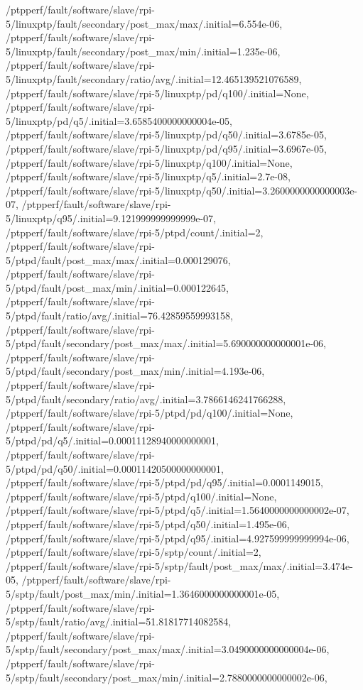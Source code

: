 {    /ptpperf/fault/software/slave/rpi-5/linuxptp/fault/secondary/post_max/max/.initial=6.554e-06,
    /ptpperf/fault/software/slave/rpi-5/linuxptp/fault/secondary/post_max/min/.initial=1.235e-06,
    /ptpperf/fault/software/slave/rpi-5/linuxptp/fault/secondary/ratio/avg/.initial=12.465139521076589,
    /ptpperf/fault/software/slave/rpi-5/linuxptp/pd/q100/.initial=None,
    /ptpperf/fault/software/slave/rpi-5/linuxptp/pd/q5/.initial=3.6585400000000004e-05,
    /ptpperf/fault/software/slave/rpi-5/linuxptp/pd/q50/.initial=3.6785e-05,
    /ptpperf/fault/software/slave/rpi-5/linuxptp/pd/q95/.initial=3.6967e-05,
    /ptpperf/fault/software/slave/rpi-5/linuxptp/q100/.initial=None,
    /ptpperf/fault/software/slave/rpi-5/linuxptp/q5/.initial=2.7e-08,
    /ptpperf/fault/software/slave/rpi-5/linuxptp/q50/.initial=3.2600000000000003e-07,
    /ptpperf/fault/software/slave/rpi-5/linuxptp/q95/.initial=9.121999999999999e-07,
    /ptpperf/fault/software/slave/rpi-5/ptpd/count/.initial=2,
    /ptpperf/fault/software/slave/rpi-5/ptpd/fault/post_max/max/.initial=0.000129076,
    /ptpperf/fault/software/slave/rpi-5/ptpd/fault/post_max/min/.initial=0.000122645,
    /ptpperf/fault/software/slave/rpi-5/ptpd/fault/ratio/avg/.initial=76.42859559993158,
    /ptpperf/fault/software/slave/rpi-5/ptpd/fault/secondary/post_max/max/.initial=5.690000000000001e-06,
    /ptpperf/fault/software/slave/rpi-5/ptpd/fault/secondary/post_max/min/.initial=4.193e-06,
    /ptpperf/fault/software/slave/rpi-5/ptpd/fault/secondary/ratio/avg/.initial=3.7866146241766288,
    /ptpperf/fault/software/slave/rpi-5/ptpd/pd/q100/.initial=None,
    /ptpperf/fault/software/slave/rpi-5/ptpd/pd/q5/.initial=0.00011128940000000001,
    /ptpperf/fault/software/slave/rpi-5/ptpd/pd/q50/.initial=0.00011420500000000001,
    /ptpperf/fault/software/slave/rpi-5/ptpd/pd/q95/.initial=0.0001149015,
    /ptpperf/fault/software/slave/rpi-5/ptpd/q100/.initial=None,
    /ptpperf/fault/software/slave/rpi-5/ptpd/q5/.initial=1.5640000000000002e-07,
    /ptpperf/fault/software/slave/rpi-5/ptpd/q50/.initial=1.495e-06,
    /ptpperf/fault/software/slave/rpi-5/ptpd/q95/.initial=4.927599999999994e-06,
    /ptpperf/fault/software/slave/rpi-5/sptp/count/.initial=2,
    /ptpperf/fault/software/slave/rpi-5/sptp/fault/post_max/max/.initial=3.474e-05,
    /ptpperf/fault/software/slave/rpi-5/sptp/fault/post_max/min/.initial=1.3646000000000001e-05,
    /ptpperf/fault/software/slave/rpi-5/sptp/fault/ratio/avg/.initial=51.81817714082584,
    /ptpperf/fault/software/slave/rpi-5/sptp/fault/secondary/post_max/max/.initial=3.0490000000000004e-06,
    /ptpperf/fault/software/slave/rpi-5/sptp/fault/secondary/post_max/min/.initial=2.7880000000000002e-06,
}
